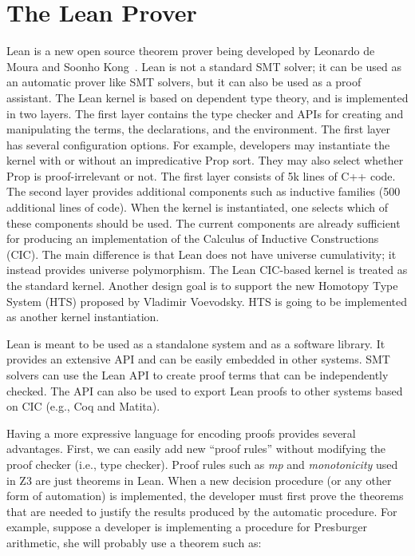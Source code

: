 \documentclass{llncs}
\begin{document}
\section{The Lean Prover}
\label{sec:lean}
Lean is a new open source theorem prover being developed by Leonardo
de Moura and Soonho Kong~\cite{lean}. Lean is not a standard SMT
solver; it can be used as an automatic prover like SMT solvers, but it
can also be used as a proof assistant. The Lean kernel is based on
dependent type theory, and is implemented in two layers. The first
layer contains the type checker and APIs for creating and
manipulating the terms, the declarations, and the environment. The first
layer has several configuration options. For example, developers may
instantiate the kernel with or without an impredicative Prop sort.
They may also select whether Prop is proof-irrelevant or not. The
first layer consists of 5k lines of C++ code. The second layer
provides additional components such as inductive families (500
additional lines of code). When the kernel is instantiated, one
selects which of these components should be used. The current
components are already sufficient for producing an implementation of
the Calculus of Inductive Constructions (CIC). The main difference is
that Lean does not have universe cumulativity; it instead provides
universe polymorphism. The Lean CIC-based kernel is treated as the standard
kernel. Another design goal is to support the new Homotopy Type System
(HTS) proposed by Vladimir Voevodsky. HTS is going to be implemented
as another kernel instantiation.

Lean is meant to be used as a standalone system and as a software
library. It provides an extensive API and can be easily embedded in
other systems. SMT solvers can use the Lean API to create proof terms
that can be independently checked. The API can also be used to export
Lean proofs to other systems based on CIC (e.g., Coq and Matita).

Having a more expressive language for encoding proofs provides several
advantages. First, we can easily add new ``proof rules'' without
modifying the proof checker (i.e., type checker). Proof rules such as
\emph{mp} and \emph{monotonicity} used in Z3 are just theorems in Lean.
When a new decision procedure (or any other form of
automation) is implemented, the developer must first prove the theorems
that are needed to justify the results produced by the automatic
procedure. For example, suppose a developer is implementing a procedure for
Presburger arithmetic, she will probably use a theorem such as:
\end{document}
